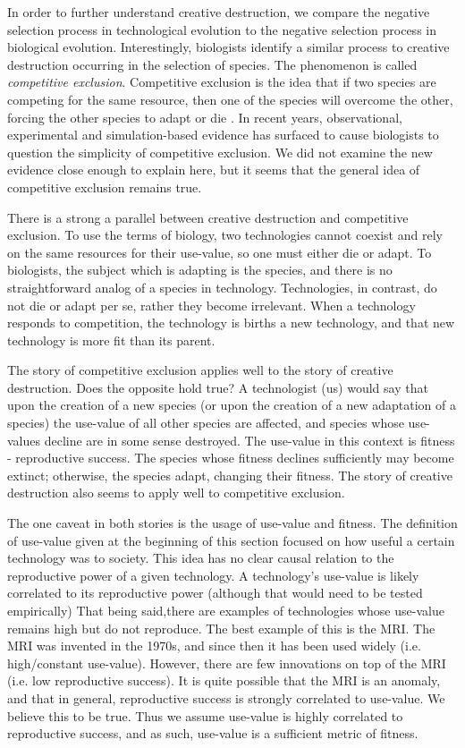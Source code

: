 \documentclass[11pt]{article}
\begin{document}
In order to further understand creative destruction, we compare the negative selection process in technological evolution to the negative selection process in biological evolution.
Interestingly, biologists identify a similar process to creative destruction occurring in the selection of species.
The phenomenon is called \textit{competitive exclusion}. 
Competitive exclusion is the idea that if two species are competing for the same resource, then one of the species will overcome the other, forcing the other species to adapt or die \cite{wiki}. 
In recent years, observational, experimental and simulation-based evidence has surfaced to cause biologists to question the simplicity of competitive exclusion.
We did not examine the new evidence close enough to explain here, but it seems that the general idea of competitive exclusion remains true.

There is a strong a parallel between creative destruction and competitive exclusion.
To use the terms of biology, two technologies cannot coexist and rely on the same resources for their use-value, so one must either die or adapt. 
To biologists, the subject which is adapting is the species, and there is no straightforward analog of a species in technology. 
Technologies, in contrast, do not die or adapt per se, rather they become irrelevant.
When a technology responds to competition, the technology is births a new technology, and that new technology is more fit than its parent.

The story of competitive exclusion applies well to the story of creative destruction.
Does the opposite hold true?
A technologist (us) would say that upon the creation of a new species (or upon the creation of a new adaptation of a species) the use-value of all other species are affected, and species whose use-values decline are in some sense destroyed. 
The use-value in this context is fitness - reproductive success.
The species whose fitness declines sufficiently may become extinct; otherwise, the species adapt, changing their fitness. 
The story of creative destruction also seems to apply well to competitive exclusion.

The one caveat in both stories is the usage of use-value and fitness. 
The definition of use-value given at the beginning of this section focused on how useful a certain technology was to society. 
This idea has no clear causal relation to the reproductive power of a given technology. 
A technology's use-value is likely correlated to its reproductive power (although that would need to be tested empirically)
That being said,there are examples of technologies whose use-value remains high but do not reproduce. 
The best example of this is the MRI.
The MRI was invented in the 1970s, and since then it has been used widely (i.e. high/constant use-value).
However, there are few innovations on top of the MRI (i.e. low reproductive success). 
It is quite possible that the MRI is an anomaly, and that in general, reproductive success is strongly correlated to use-value. 
We believe this to be true.
Thus we assume use-value is highly correlated to reproductive success, and as such, use-value is a sufficient metric of fitness.
\end{document}
